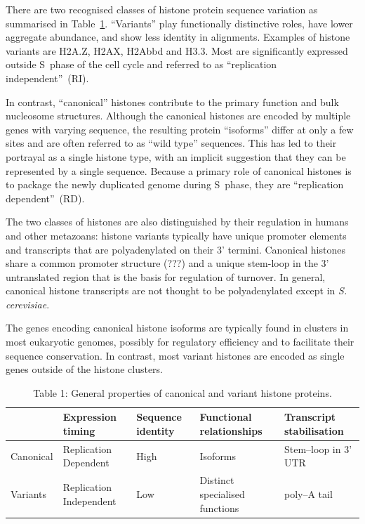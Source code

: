 \documentclass[10pt,a4paper,draft,article]{memoir}
\begin{document}
    There are two recognised classes of histone protein sequence variation as summarised in
    Table~\ref{tab:typical-histone-differences}. ``Variants'' play functionally distinctive
    roles, have lower aggregate abundance,
    and show less identity in alignments. Examples of histone variants are H2A.Z, H2AX, H2Abbd
    and H3.3. Most are significantly expressed outside S~phase of the cell cycle and referred
    to as ``replication independent''~(RI).

    In contrast, ``canonical'' histones contribute to the primary function and bulk nucleosome
    structures. Although the canonical histones are encoded by multiple genes with varying
    sequence, the resulting protein ``isoforms'' differ at only a few sites and are often
    referred to as ``wild type'' sequences. This has led to their portrayal as a single histone
    type, with an implicit suggestion that they can be represented by a single sequence. Because
    a primary role of canonical histones is to package the newly duplicated genome during
    S~phase, they are ``replication dependent''~(RD).

    The two classes of histones are also distinguished by their regulation in humans and other
    metazoans: histone variants typically have unique promoter elements and transcripts that
    are polyadenylated on their 3' termini.  Canonical
    histones share a common promoter structure (???) and a unique stem-loop in the 3' untranslated
    region that is the basis for regulation of turnover. In general, canonical histone transcripts
    are not thought to be polyadenylated except in \textit{S. cerevisiae}.

    The genes encoding canonical histone isoforms are typically found in clusters in most eukaryotic
    genomes, possibly for regulatory efficiency and to facilitate their sequence conservation. In
    contrast, most variant histones are encoded as single genes outside of the histone clusters.

    \begin{table}
      \centering
      \begin{tabular}{l | l | l | l | l }
        \null     & Expression timing       & Sequence identity & Functional relationships       & Transcript stabilisation \\
        \hline
        Canonical & Replication Dependent   & High              & Isoforms                       & Stem--loop in 3' UTR \\
        Variants  & Replication Independent & Low               & Distinct specialised functions & poly--A tail \\
      \end{tabular}
      \caption{Table 1: General properties of canonical and variant histone proteins.}
      \label{tab:typical-histone-differences}
    \end{table}
\end{document}
